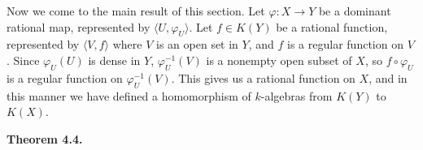 {\smallskip
Now we come to the main result of this section. Let $\varphi\colon X\to Y$ be a dominant rational map, represented by $\langle U,\varphi_U\rangle$. Let $f\in K(Y)$ be a rational function, represented by $\langle V,f\rangle$ where $V$ is an open set in $Y$, and $f$ is a regular function on $V$. Since $\varphi_U(U)$ is dense in $Y$, $\varphi_U^{-1}(V)$ is a nonempty open subset of $X$, so $f\circ\varphi_U$ is a regular function on $\varphi_U^{-1}(V)$. This gives us a rational function on $X$, and in this manner we have defined a homomorphism of $k$-algebras from $K(Y)$ to $K(X)$.

\smallskip
\noindent\hypertarget{result-I-4.4}{}\textbf{Theorem 4.4.}%
}
